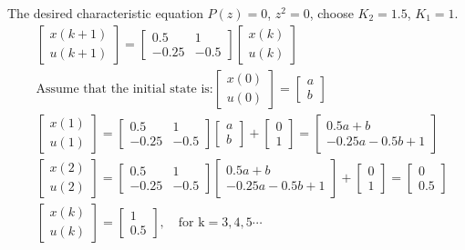 The desired characteristic equation $P(z)=0$, $z^2=0$, choose $K_2=1.5$, $K_1=1$. 
\begin{align*}
& \begin{bmatrix}
x(k+1) \\
u(k+1)
\end{bmatrix}=\begin{bmatrix}
0.5       &  1 \\
-0.25     & -0.5
\end{bmatrix}\begin{bmatrix}
x(k) \\      
u(k) 
\end{bmatrix} \\
& \text{Assume that the initial state is:} \begin{bmatrix}
x(0) \\      
u(0) 
\end{bmatrix} = \begin{bmatrix}
a \\      
b 
\end{bmatrix} \\
& \begin{bmatrix}
x(1) \\      
u(1) 
\end{bmatrix} = \begin{bmatrix}
0.5       &  1 \\
-0.25     & -0.5
\end{bmatrix}\begin{bmatrix}
a \\      
b 
\end{bmatrix}+ \begin{bmatrix}
0  \\
1
\end{bmatrix} = \begin{bmatrix}
0.5a +b \\
-0.25a -0.5b+1
\end{bmatrix} \\
& \begin{bmatrix}
x(2) \\      
u(2) 
\end{bmatrix} = \begin{bmatrix}
0.5       &  1 \\
-0.25     & -0.5
\end{bmatrix} \begin{bmatrix}
0.5a +b \\
-0.25a -0.5b+1
\end{bmatrix} + \begin{bmatrix}
0  \\
1
\end{bmatrix} =\begin{bmatrix}
0  \\
0.5
\end{bmatrix} \\
& \begin{bmatrix}
 x(k) \\
 u(k)
\end{bmatrix}=\begin{bmatrix}
1  \\
0.5
\end{bmatrix}, \quad \text{for k}=3,4,5 \cdots 
\end{align*}
